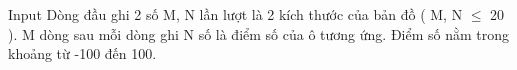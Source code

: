 Input
Dòng đầu ghi 2 số M, N lần lượt là 2 kích thước của bản đồ ( M, N  $\le$  20 ). M dòng sau mỗi dòng ghi N số là điểm số của ô tương ứng. Điểm số nằm trong khoảng từ -100 đến 100.